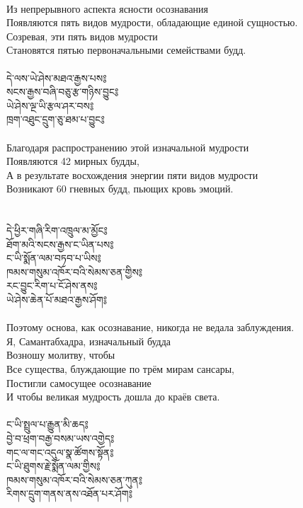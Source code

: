 \\
Из непрерывного аспекта ясности осознавания\\
Появляются пять видов мудрости, обладающие единой сущностью.\\
Созревая, эти пять видов мудрости \\
Становятся пятью первоначальными семействами будд.\\
\\
{\ti
དེ་ལས་ཡེ་ཤེས་མཐའ་རྒྱས་པས༔ \\
སངས་རྒྱས་བཞི་བཅུ་རྩ་གཉིས་བྱུང༔ \\
ཡེ་ཤེས་ལྔ་ཡི་རྩལ་ཤར་བས༔ \\
ཁྲག་འཐུང་དྲུག་ཅུ་ཐམ་པ་བྱུང༔}\\
\\
Благодаря распространению этой изначальной мудрости \\
Появляются 42 мирных будды,\\
А в результате восхождения энергии пяти видов мудрости \\
Возникают 60 гневных будд, пьющих кровь эмоций.\\
\\
\newpage
\\
{\ti
དེ་ཕྱིར་གཞི་རིག་འཁྲུལ་མ་མྱོང༔ \\
ཐོག་མའི་སངས་རྒྱས་ང་ཡིན་པས༔ \\
ང་ཡི་སྨོན་ལམ་བཏབ་པ་ཡིས༔ \\
ཁམས་གསུམ་འཁོར་བའི་སེམས་ཅན་གྱིས༔ \\
རང་བྱུང་རིག་པ་ངོ་ཤེས་ནས༔ \\
ཡེ་ཤེས་ཆེན་པོ་མཐའ་རྒྱས་ཤོག༔}\\
\\
Поэтому основа, как осознавание, никогда не ведала заблуждения. \\
Я, Самантабхадра, изначальный будда\\
Возношу молитву, чтобы\\
Все существа, блуждающие по трём мирам сансары, \\
Постигли самосущее осознавание \\
И чтобы великая мудрость дошла до краёв света.\\
\\
{\ti
ང་ཡི་སྤྲུལ་པ་རྒྱུན་མི་ཆད༔ \\
བྱེ་བ་ཕྲག་བརྒྱ་བསམ་ཡས་འགྱེད༔ \\
གང་ལ་གང་འདུལ་སྣ་ཚོགས་སྟོན༔ \\
ང་ཡི་ཐུགས་རྗེ་སྨོན་ལམ་གྱིས༔ \\
ཁམས་གསུམ་འཁོར་བའི་སེམས་ཅན་ཀུན༔ \\
རིགས་དྲུག་གནས་ནས་འཐོན་པར་ཤོག༔}\\
